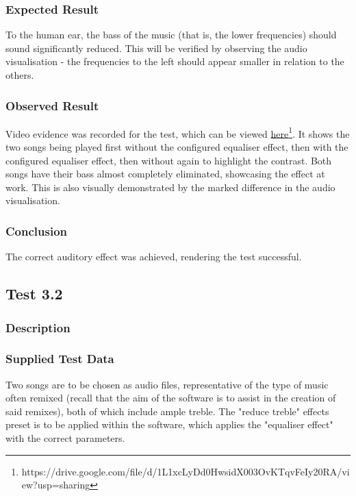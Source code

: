 \subsubsection{Expected Result}
To the human ear, the bass of the music (that is, the lower frequencies) should sound significantly reduced. This will be verified by observing the audio visualisation - the frequencies to the left should appear smaller in relation to the others.

\subsubsection{Observed Result}
\label{sec:evidence3.1}
Video evidence was recorded for the test, which can be viewed \href{https://drive.google.com/file/d/1L1xcLyDd0HwsidX003OvKTqvFeIy20RA/view?usp=sharing}{here}\footnote{
	https://drive.google.com/file/d/1L1xcLyDd0HwsidX003OvKTqvFeIy20RA/view?usp=sharing
}. It shows the two songs being played first without the configured equaliser effect, then with the configured equaliser effect, then without again to highlight the contrast. Both songs have their bass almost completely eliminated, showcasing the effect at work. This is also visually demonstrated by the marked difference in the audio visualisation.

\subsubsection{Conclusion}
The correct auditory effect was achieved, rendering the test successful. 


\pagebreak
\subsection{Test 3.2}
\subsubsection{Description}
\paragraph{}
{
	\centering
}

\subsubsection{Supplied Test Data}
Two songs are to be chosen as audio files, representative of the type of music often remixed (recall that the aim of the software is to assist in the creation of said remixes), both of which include ample treble. The "reduce treble" effects preset is to be applied within the software, which applies the "equaliser effect" with the correct parameters.

